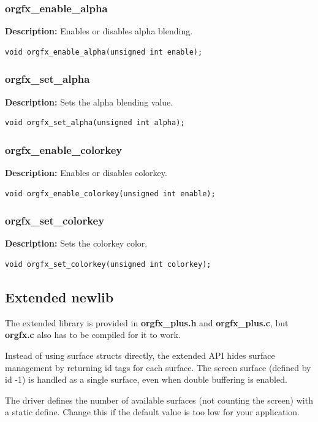 \documentclass[10pt,a4paper]{article}
\begin{document}
\subsubsection{orgfx\_enable\_alpha}
\textbf{Description:} Enables or disables alpha blending.
\begin{lstlisting}
void orgfx_enable_alpha(unsigned int enable);
\end{lstlisting}

\subsubsection{orgfx\_set\_alpha}
\textbf{Description:} Sets the alpha blending value.
\begin{lstlisting}
void orgfx_set_alpha(unsigned int alpha);
\end{lstlisting}

\subsubsection{orgfx\_enable\_colorkey}
\textbf{Description:} Enables or disables colorkey.
\begin{lstlisting}
void orgfx_enable_colorkey(unsigned int enable);
\end{lstlisting}

\subsubsection{orgfx\_set\_colorkey}
\textbf{Description:} Sets the colorkey color.
\begin{lstlisting}
void orgfx_set_colorkey(unsigned int colorkey);
\end{lstlisting}

\subsection{Extended newlib}
The extended library is provided in \textbf{orgfx\_plus.h} and \textbf{orgfx\_plus.c}, but \textbf{orgfx.c} also has to be compiled for it to work.

Instead of using surface structs directly, the extended API hides surface management by returning id tags for each surface. The screen surface (defined by id -1) is handled as a single surface, even when double buffering is enabled.

The driver defines the number of available surfaces (not counting the screen) with a static define. Change this if the default value is too low for your application.
\end{document}
